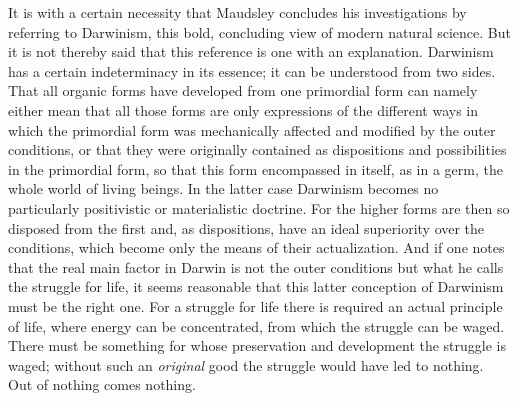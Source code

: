 \documentclass[12pt,a4paper,openany]{book}
\begin{document}
It is with a certain necessity that Maudsley concludes
his investigations by referring to Darwinism, this
bold, concluding view of modern natural science.
But it is not thereby said that this reference is one with an
explanation. Darwinism has a certain indeterminacy in its
essence; it can be understood from two sides. That all organic
forms have developed from one primordial form can namely either
mean that all those forms are only expressions of the different
ways in which the primordial form was mechanically affected and
modified by the outer conditions, or that they were originally
contained as dispositions and possibilities in the primordial form, so that
this form encompassed in itself, as in a germ, the whole world of
living beings. In the latter case Darwinism becomes no
particularly positivistic or materialistic doctrine. For the higher
forms are then so disposed from the first and, as dispositions, have an
ideal superiority over the conditions, which become only the means
of their actualization. And if one notes that the
real main factor in Darwin is not the outer conditions
but what he calls the struggle for life, it seems
reasonable that this latter conception of Darwinism must
be the right one. For a struggle for life there is required an actual
principle of life, where energy can be concentrated, from which
the struggle can be waged. There must be something for whose preservation
and development the struggle is waged; without such an \emph{original} good
the struggle would have led to nothing. Out of nothing comes nothing.
\end{document}
